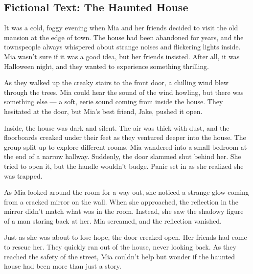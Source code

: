 \documentclass[12pt]{article}
\begin{document}
\onehalfspacing

\subsection*{Fictional Text: The Haunted House}

\begin{tcolorbox}[colframe=black!40, colback=gray!5]

\begin{spacing}{1.15}

It was a cold, foggy evening when Mia and her friends decided to visit the old mansion at the edge of town. The house had been abandoned for years, and the townspeople always whispered about strange noises and flickering lights inside. Mia wasn’t sure if it was a good idea, but her friends insisted. After all, it was Halloween night, and they wanted to experience something thrilling.

As they walked up the creaky stairs to the front door, a chilling wind blew through the trees. Mia could hear the sound of the wind howling, but there was something else — a soft, eerie sound coming from inside the house. They hesitated at the door, but Mia’s best friend, Jake, pushed it open. 

Inside, the house was dark and silent. The air was thick with dust, and the floorboards creaked under their feet as they ventured deeper into the house. The group split up to explore different rooms. Mia wandered into a small bedroom at the end of a narrow hallway. Suddenly, the door slammed shut behind her. She tried to open it, but the handle wouldn’t budge. Panic set in as she realized she was trapped.

As Mia looked around the room for a way out, she noticed a strange glow coming from a cracked mirror on the wall. When she approached, the reflection in the mirror didn’t match what was in the room. Instead, she saw the shadowy figure of a man staring back at her. Mia screamed, and the reflection vanished.

Just as she was about to lose hope, the door creaked open. Her friends had come to rescue her. They quickly ran out of the house, never looking back. As they reached the safety of the street, Mia couldn’t help but wonder if the haunted house had been more than just a story.

\end{spacing}

\end{tcolorbox}
\end{document}
